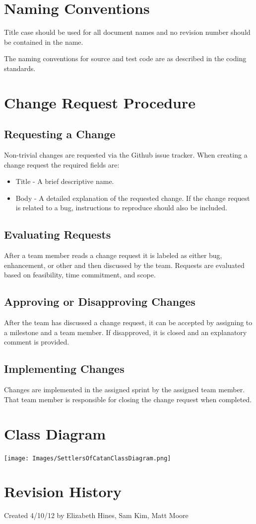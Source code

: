 \documentclass[12pt]{article}
\begin{document}
\section{Naming Conventions}
Title case should be used for all document names and no revision number should be contained in the name.

The naming conventions for source and test code are as described in the coding standards.

\section{Change Request Procedure}
\subsection{Requesting a Change}
Non-trivial changes are requested via the Github issue tracker. When creating a change request the required fields are:
\begin{itemize}
\item Title - A brief descriptive name.
\item Body - A detailed explanation of the requested change. If the change request is related to a bug, instructions to reproduce should also be included.
\end{itemize}

\subsection{Evaluating Requests}
After a team member reads a change request it is labeled as either bug, enhancement, or other and then discussed by the team. Requests are evaluated based on feasibility, time commitment, and scope.

\subsection{Approving or Disapproving Changes}
After the team has discussed a change request, it can be accepted by assigning to a milestone and a team member. If disapproved, it is closed and an explanatory comment is provided.

\subsection{Implementing Changes}
Changes are implemented in the assigned sprint by the assigned team member. That team member is responsible for closing the change request when completed.

\newpage
\section{Class Diagram}
  \begin{center}
    \texttt{[image: Images/SettlersOfCatanClassDiagram.png]}
  \end{center}





\newpage
\section{Revision History}
Created 4/10/12 by Elizabeth Hines, Sam Kim, Matt Moore
\end{document}
